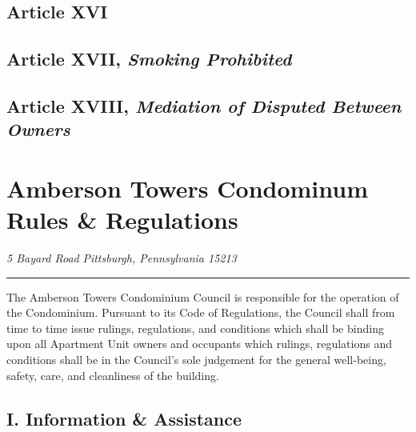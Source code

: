 \documentclass[
]{book}
\begin{document}
\hypertarget{article-xvi}{%
\section*{Article XVI}\label{article-xvi}}

\hypertarget{article-xvii-smoking-prohibited}{%
\section*{\texorpdfstring{Article XVII, \emph{Smoking Prohibited}}{Article XVII, Smoking Prohibited}}\label{article-xvii-smoking-prohibited}}

\hypertarget{article-xviii-mediation-of-disputed-between-owners}{%
\section*{\texorpdfstring{Article XVIII, \emph{Mediation of Disputed Between Owners}}{Article XVIII, Mediation of Disputed Between Owners}}\label{article-xviii-mediation-of-disputed-between-owners}}

\hypertarget{amberson-towers-condominum-rules-regulations-1}{%
\chapter{\texorpdfstring{Amberson Towers Condominum Rules \& Regulations}{Amberson Towers Condominum   Rules \& Regulations}}\label{amberson-towers-condominum-rules-regulations-1}}

\emph{5 Bayard Road}
\emph{Pittsburgh, Pennsylvania 15213}

\begin{center}\rule{0.5\linewidth}{0.5pt}\end{center}

The Amberson Towers Condominium Council is responsible for the operation of the Condominium. Pursuant to its Code of Regulations, the Council shall from time to time issue rulings, regulations, and conditions which shall be binding upon all Apartment Unit owners and occupants which rulings, regulations and conditions shall be in the Council's sole judgement for the general well-being, safety, care, and cleanliness of the building.

\hypertarget{i.-information-assistance-1}{%
\section*{I. Information \& Assistance}\label{i.-information-assistance-1}}
\end{document}
